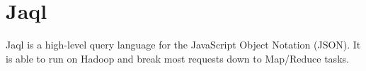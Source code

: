 \section{Jaql}

Jaql is a high-level query language for the JavaScript Object Notation (JSON). It is able to run on Hadoop and break most
requests down to Map/Reduce tasks.